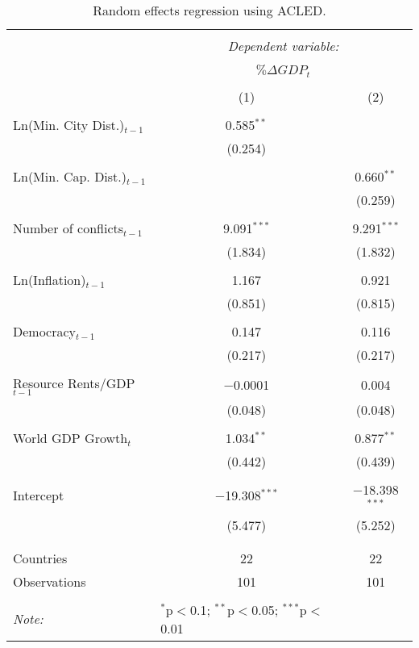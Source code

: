 \begin{table}[!htbp] \centering 
  \caption{Random effects regression using ACLED.} 
  \label{tab:acledRegResults} 
\footnotesize{
\begin{tabular}{@{\extracolsep{5pt}}lcc} 
\\[-1.8ex]\hline 
\hline \\[-1.8ex] 
 & \multicolumn{2}{c}{\textit{Dependent variable:}} \\ 
\cline{2-3} 
\\[-1.8ex] & \multicolumn{2}{c}{$\% \Delta GDP_{t}$} \\ 
\\[-1.8ex] & (1) & (2)\\ 
\hline \\[-1.8ex] 
 Ln(Min. City Dist.)$_{t-1}$ & 0.585$^{**}$ &  \\ 
  & (0.254) &  \\ 
  & & \\ 
 Ln(Min. Cap. Dist.)$_{t-1}$ &  & 0.660$^{**}$ \\ 
  &  & (0.259) \\ 
  & & \\ 
 Number of conflicts$_{t-1}$ & 9.091$^{***}$ & 9.291$^{***}$ \\ 
  & (1.834) & (1.832) \\ 
  & & \\ 
 Ln(Inflation)$_{t-1}$ & 1.167 & 0.921 \\ 
  & (0.851) & (0.815) \\ 
  & & \\ 
 Democracy$_{t-1}$ & 0.147 & 0.116 \\ 
  & (0.217) & (0.217) \\ 
  & & \\ 
 Resource Rents/GDP$_{t-1}$ & $-$0.0001 & 0.004 \\ 
  & (0.048) & (0.048) \\ 
  & & \\ 
 World GDP Growth$_{t}$ & 1.034$^{**}$ & 0.877$^{**}$ \\ 
  & (0.442) & (0.439) \\ 
  & & \\ 
 Intercept & $-$19.308$^{***}$ & $-$18.398$^{***}$ \\ 
  & (5.477) & (5.252) \\ 
  & & \\ 
\hline \\[-1.8ex] 
Countries & 22 & 22  \\ 
Observations & 101 & 101 \\ 
\hline 
\hline \\[-1.8ex] 
\textit{Note:}  & \multicolumn{1}{l}{$^{*}$p$<$0.1; $^{**}$p$<$0.05; $^{***}$p$<$0.01} \\ 
\end{tabular} 
}
\end{table} 